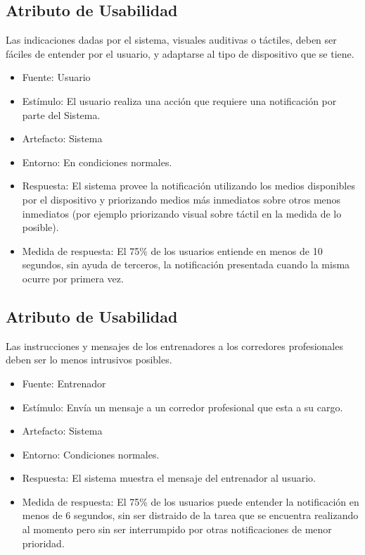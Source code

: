 \subsection{Atributo de Usabilidad}

Las indicaciones dadas por el sistema, visuales auditivas o táctiles,
deben ser fáciles de entender por el usuario, y adaptarse al tipo de
dispositivo que se tiene.

\begin{itemize}
\itemsep1pt\parskip0pt
\item
  Fuente: Usuario
\item
  Estímulo: El usuario realiza una acción que requiere una notificación
  por parte del Sistema.
\item
  Artefacto: Sistema
\item
  Entorno: En condiciones normales.
\item
  Respuesta: El sistema provee la notificación utilizando los medios
  disponibles por el dispositivo y priorizando medios más inmediatos
  sobre otros menos inmediatos (por ejemplo priorizando visual sobre
  táctil en la medida de lo posible).
\item
  Medida de respuesta: El 75\% de los usuarios entiende en menos de 10
  segundos, sin ayuda de terceros, la notificación presentada cuando la
  misma ocurre por primera vez.
\end{itemize}

\subsection{Atributo de Usabilidad}

Las instrucciones y mensajes de los entrenadores a los corredores
profesionales deben ser lo menos intrusivos posibles.

\begin{itemize}
\itemsep1pt\parskip0pt
\item
  Fuente: Entrenador
\item
  Estímulo: Envía un mensaje a un corredor profesional que esta a su
  cargo.
\item
  Artefacto: Sistema
\item
  Entorno: Condiciones normales.
\item
  Respuesta: El sistema muestra el mensaje del entrenador al usuario.
\item
  Medida de respuesta: El 75\% de los usuarios puede entender la
  notificación en menos de 6 segundos, sin ser distraido de la tarea que
  se encuentra realizando al momento pero sin ser interrumpido por otras
  notificaciones de menor prioridad.
\end{itemize}

